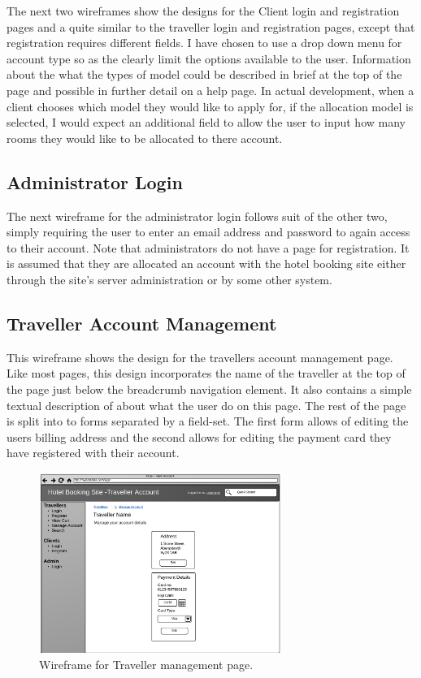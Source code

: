 \documentclass{article}
\begin{document}
The next two wireframes show the designs for the Client login and registration pages and a quite similar to the traveller login and registration pages, except that registration requires different fields. I have chosen to use a drop down menu for account type so as the clearly limit the options available to the user. Information about the what the types of model could be described in brief at the top of the page and possible in further detail on a help page. In actual development, when a client chooses which model they would like to apply for, if the allocation model is selected, I would expect an additional field to allow the user to input how many rooms they would like to be allocated to there account.

\subsection{Administrator Login}
The next wireframe for the administrator login follows suit of the other two, simply requiring the user to enter an email address and password to again access to their account. Note that administrators do not have a page for registration. It is assumed that they are allocated an account with the hotel booking site either through the site's server administration or by some other system.


\subsection{Traveller Account Management}
This wireframe shows the design for the travellers account management page. Like most pages, this design incorporates the name of the traveller at the top of the page just below the breadcrumb navigation element. It also contains a simple textual description of about what the user do on this page. The rest of the page is split into to forms separated by a field-set. The first form allows of editing the users billing address and the second allows for editing the payment card they have registered with their account.

\begin{figure}[H]
\centering
\includegraphics[width=0.7\textwidth]{img/wireframes/TravellerAccount.png}
\caption{Wireframe for Traveller management page.}
\label{fig:wireframe-client-register}
\end{figure}
\end{document}
